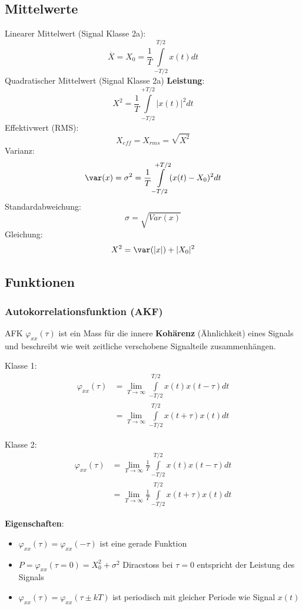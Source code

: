 \subsection{Mittelwerte}

\noindent 
Linearer Mittelwert (Signal Klasse 2a): \[\overline{X} = X_0 = \frac{1}{T}\int\limits_{-T/2}^{T/2}x(t)dt\]
Quadratischer Mittelwert (Signal Klasse 2a) \textbf{Leistung}: \[X^2 =  \frac{1}{T}\int\limits_{-T/2}^{+T/2}\left|x(t)\right|^2dt\] 
Effektivwert (RMS): \[X_{eff} = X_{rms} = \sqrt{X^2}\] 
Varianz: \[ \var(x) =  \sigma^2 = \frac{1}{T}\int\limits_{-T/2}^{+T/2}(x(t) - X_0)^2dt \]
Standardabweichung: \[ \sigma = \sqrt{Var(x)}\]
Gleichung: 
\[X^2 = \var(|x|) + |X_0|^2\]

\subsection{Funktionen}
\subsubsection{Autokorrelationsfunktion (AKF)}
AFK $\varphi_{xx}(\tau)$ ist ein Mass für die innere \textbf{Kohärenz} (Ähnlichkeit) eines Signals und beschreibt wie weit zeitliche verschobene Signalteile zusammenhängen.

Klasse 1:
\begin{align*}
	\varphi_{xx}(\tau) &= \lim\limits_{T\rightarrow\infty}\int\limits_{-T/2}^{T/2}x(t)x(t-\tau)dt \\
	&= \lim\limits_{T\rightarrow\infty}\int\limits_{-T/2}^{T/2}x(t+\tau)x(t)dt
\end{align*}

Klasse 2:
\begin{align*}
	\varphi_{xx}(\tau) &= \lim\limits_{T\rightarrow\infty}\frac{1}{T}\int\limits_{-T/2}^{T/2}x(t)x(t-\tau)dt \\
	&= \lim\limits_{T\rightarrow\infty}\frac{1}{T}\int\limits_{-T/2}^{T/2}x(t+\tau)x(t)dt
\end{align*}

\noindent\textbf{Eigenschaften}:
\begin{itemize}[nosep]
	\item $\varphi_{xx}(\tau) = \varphi_{xx}(-\tau)$ ist eine gerade Funktion
	\item $P = \varphi_{xx}(\tau = 0) = X_0^2 + \sigma^2$ Diracstoss bei $\tau =0$ entspricht der Leistung des Signals 
	\item $\varphi_{xx}(\tau) = \varphi_{xx}(\tau \pm kT)$ ist periodisch mit gleicher Periode wie Signal $x(t)$
\end{itemize}

